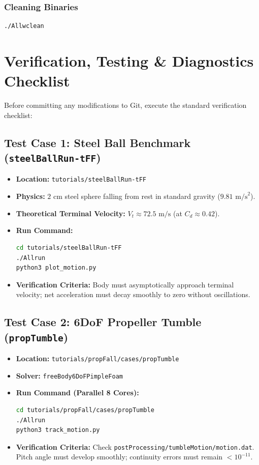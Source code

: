 \documentclass[11pt,a4paper]{article}
\begin{document}
\subsubsection{Cleaning Binaries}
\begin{lstlisting}[language=bash]
./Allwclean
\end{lstlisting}

\section{Verification, Testing \& Diagnostics Checklist}

Before committing any modifications to Git, execute the standard verification checklist:

\subsection{Test Case 1: Steel Ball Benchmark (\texttt{steelBallRun-tFF})}
\begin{itemize}
    \item \textbf{Location:} \texttt{tutorials/steelBallRun-tFF}
    \item \textbf{Physics:} $2\text{ cm}$ steel sphere falling from rest in standard gravity ($9.81\text{ m/s}^2$).
    \item \textbf{Theoretical Terminal Velocity:} $V_t \approx 72.5\text{ m/s}$ (at $C_d \approx 0.42$).
    \item \textbf{Run Command:}
\begin{lstlisting}[language=bash]
cd tutorials/steelBallRun-tFF
./Allrun
python3 plot_motion.py
\end{lstlisting}
    \item \textbf{Verification Criteria:} Body must asymptotically approach terminal velocity; net acceleration must decay smoothly to zero without oscillations.
\end{itemize}

\subsection{Test Case 2: 6DoF Propeller Tumble (\texttt{propTumble})}
\begin{itemize}
    \item \textbf{Location:} \texttt{tutorials/propFall/cases/propTumble}
    \item \textbf{Solver:} \texttt{freeBody6DoFPimpleFoam}
    \item \textbf{Run Command (Parallel 8 Cores):}
\begin{lstlisting}[language=bash]
cd tutorials/propFall/cases/propTumble
./Allrun
python3 track_motion.py
\end{lstlisting}
    \item \textbf{Verification Criteria:} Check \texttt{postProcessing/tumbleMotion/motion.dat}. Pitch angle must develop smoothly; continuity errors must remain $< 10^{-11}$.
\end{itemize}
\end{document}
